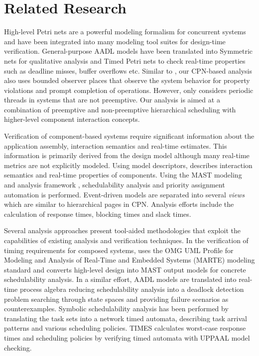 \section{Related Research}
\label{sec:Related_Research}

High-level Petri nets are a powerful modeling formalism for concurrent systems and have been integrated into many modeling tool suites for design-time verification. General-purpose AADL models have been translated into Symmetric nets for qualitative analysis \cite{kordon_sn} and Timed Petri nets \cite{kordon2009} to check real-time properties such as deadline misses, buffer overflows etc. Similar to \cite{kordon2009}, our CPN-based analysis also uses bounded observer places \cite{Alpern1989} that observe the system behavior for property violations and prompt completion of operations. However, \cite{kordon2009} only considers periodic threads in systems that are not preemptive. Our analysis is aimed at a combination of preemptive and non-preemptive hierarchical scheduling with higher-level component interaction concepts.

Verification of component-based systems require significant information about the application assembly, interaction semantics and real-time estimates. This information is primarily derived from the design model although many real-time metrics are not explicitly modeled. Using model descriptors, \cite{Lopez2006} describes interaction semantics and real-time properties of components. Using the MAST modeling and analysis framework \cite{MAST1, MAST2}, schedulability analysis and priority assignment automation is performed. Event-driven models are separated into several \emph{views} which are similar to hierarchical pages in CPN. Analysis efforts include the calculation of response times, blocking times and slack times. %

Several analysis approaches present tool-aided methodologies that exploit the capabilities of existing analysis and verification techniques. In the verification of timing requirements for composed systems, \cite{medina2011} uses the OMG UML Profile for Modeling and Analysis of Real-Time and Embedded Systems (MARTE) modeling standard and converts high-level design into MAST output models for concrete schedulability analysis. In a similar effort, AADL models are translated into real-time process algebra \cite{sokolsky2006} reducing schedulability analysis into a deadlock detection problem searching through state spaces and providing failure scenarios as counterexamples. Symbolic schedulability analysis has been performed by translating the task sets into a network timed automata, describing task arrival patterns and various scheduling policies. TIMES \cite{TIMES} calculates worst-case response times and scheduling policies by verifying timed automata with UPPAAL \cite{UPPAAL} model checking.

